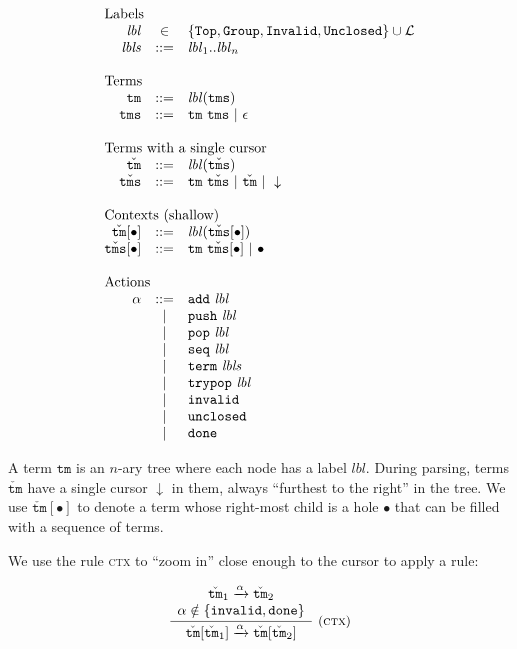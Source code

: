 \documentclass{article}
\newcommand{\rulename}{\textsc}
\newcommand{\rn}{\rulename}
\newcommand{\irule}[3]{\frac{\begin{array}{c}#2\end{array}}{\begin{array}{l}#3\end{array}}{~\small\mbox{(\rulename{#1})}}}
\newcommand{\labelFont}{\texttt}
\newcommand{\lbl}{\ensuremath{\mathit{lbl}}}
\newcommand{\lbls}{\ensuremath{\mathit{lbls}}}
\newcommand{\Top}{\ensuremath{\labelFont{Top}}}
\newcommand{\Group}{\ensuremath{\labelFont{Group}}}
\newcommand{\Invalid}{\ensuremath{\labelFont{Invalid}}}
\newcommand{\Unclosed}{\ensuremath{\labelFont{Unclosed}}}
\newcommand{\tm}{\ensuremath{\mathtt{tm}}}
\newcommand{\tms}{\ensuremath{\mathtt{tms}}}
\newcommand{\Tm}{\ensuremath{\check{\tm}}}
\newcommand{\Tms}{\ensuremath{\check{\tms}}}
\newcommand{\action}{\ensuremath{\alpha}}
\newcommand{\add}[1]{\ensuremath{\texttt{add}~#1}}
\newcommand{\push}[1]{\ensuremath{\texttt{push}~#1}}
\newcommand{\pop}[1]{\ensuremath{\texttt{pop}~#1}}
\newcommand{\trypop}[1]{\ensuremath{\texttt{trypop}~#1}}
\newcommand{\seq}[1]{\ensuremath{\texttt{seq}~#1}}
\newcommand{\term}[1]{\ensuremath{\texttt{term}~#1}}
\newcommand{\invalid}{\ensuremath{\texttt{invalid}}}
\newcommand{\unclosed}{\ensuremath{\texttt{unclosed}}}
\newcommand{\done}{\ensuremath{\texttt{done}}}
\newcommand{\cursor}{\ensuremath{\downarrow}}
\newcommand{\steps}[1]{\ensuremath{\xrightarrow{#1}}}
\newcommand{\arrayheading}[2]{\multicolumn{#1}{l}{\mbox{#2}}}
\begin{document}
\[
  \begin{array}{rcl}
    \arrayheading{3}{Labels}\\
    \lbl  & \in & \{\Top, \Group, \Invalid, \Unclosed\}\cup \mathcal{L} \\
    \lbls & ::= & \lbl_1 .. \lbl_n\\
    \\
    \arrayheading{3}{Terms}\\
    \tm  & ::= & \lbl(\tms) \\
    \tms & ::= & \tm ~ \tms ~|~ \epsilon \\
    \\
    \arrayheading{3}{Terms with a single cursor}\\
    \Tm  & ::= & \lbl(\Tms)\\
    \Tms & ::= & \tm ~ \Tms ~|~ \Tm ~|~ \cursor\\
    \\
    \arrayheading{3}{Contexts (shallow)}\\
    \Tm[\bullet] & ::= & \lbl(\Tms[\bullet])\\
    \Tms[\bullet] & ::= & \tm ~ \Tms[\bullet] ~|~ \bullet\\
    \\
    \arrayheading{3}{Actions}\\
    \action & ::= & \add{\lbl}\\
            & ~|~ & \push{\lbl}\\
            & ~|~ & \pop{\lbl}\\
            & ~|~ & \seq{\lbl}\\
            & ~|~ & \term{\lbls}\\
            & ~|~ & \trypop{\lbl}\\
            & ~|~ & \invalid\\
            & ~|~ & \unclosed\\
            & ~|~ & \done\\
  \end{array}
\]

A term \tm{} is an $n$-ary tree where each node has a label \lbl.
%
During parsing, terms \Tm{} have a single cursor \cursor{} in them,
always ``furthest to the right'' in the tree.
%
We use $\Tm[\bullet]$ to denote a term whose right-most child is a
hole $\bullet$ that can be filled with a sequence of terms.

We use the rule \rn{ctx} to ``zoom in'' close enough to the cursor
to apply a rule:

\[
\irule{ctx}{
\Tm_1 \steps{\action} \Tm_2\\
\action \notin \{\invalid, \done\}
}{
\Tm[\Tm_1] \steps{\action} \Tm[\Tm_2]
}
\]
\end{document}
